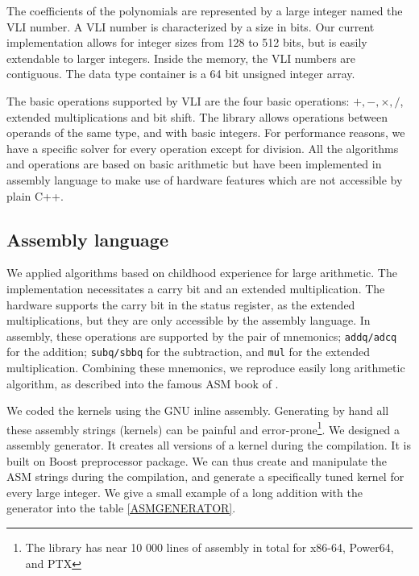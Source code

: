 \documentclass[oribibl]{llncs2e/llncs}
\begin{document}
The coefficients of the polynomials are represented by a large integer named the VLI number.  A VLI number is characterized by a size in bits.
Our current implementation allows for integer sizes from 128 to 512 bits, but is easily extendable to larger integers.
Inside the memory, the VLI numbers are  contiguous. The data type container is a 64 bit unsigned integer array.

The basic operations supported by VLI are the four basic operations: $+,-,\times, /$, extended multiplications and bit shift. The library allows  operations between operands of the same type, and with basic  integers. 
For performance reasons, we have a specific solver for every operation except  for division.
All the algorithms and operations are based on basic arithmetic but have been implemented in assembly language to make use of hardware features which are not accessible by plain C++.

\subsection{Assembly language}

We applied algorithms based on childhood  experience for large arithmetic. The implementation necessitates a carry bit and an extended multiplication. The hardware supports
the carry bit in the status register, as the extended multiplications, but they are only accessible by the assembly language.
In assembly, these operations  are supported by the pair of mnemonics; \texttt{addq/adcq} for the addition; \texttt{subq/sbbq} for the subtraction, and \texttt{mul} for the extended multiplication.   
Combining these mnemonics, we reproduce easily long arithmetic algorithm, as described into the famous  ASM book of \cite{Hyde:2003:AAL:861534}. 

We coded the kernels using the GNU inline assembly.
Generating by hand all these  assembly strings (kernels)  can be painful and error-prone\footnote{The library has near 10 000 lines of assembly in total for x86-64, Power64, and PTX}.
We designed a assembly generator. It creates all versions of a kernel during the compilation.   
It is built on Boost preprocessor package. We can thus create and manipulate the ASM strings during the compilation, 
and generate a specifically tuned kernel for every large integer. We give a small example of a long addition with the generator into the table \ref{ASMGENERATOR}.
\end{document}
